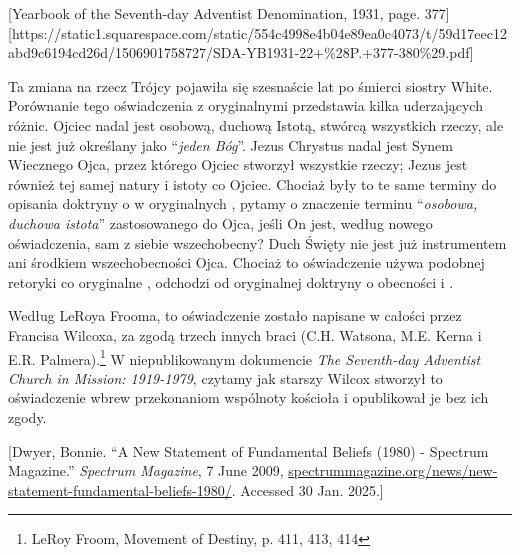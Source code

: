 [Yearbook of the Seventh-day Adventist Denomination, 1931, page. 377][https://static1.squarespace.com/static/554c4998e4b04e89ea0c4073/t/59d17eec12abd9c6194cd26d/1506901758727/SDA-YB1931-22+\%28P.+377-380\%29.pdf]

Ta zmiana na rzecz Trójcy pojawiła się szesnaście lat po śmierci siostry White. Porównanie tego oświadczenia z oryginalnymi  przedstawia kilka uderzających różnic. Ojciec nadal jest osobową, duchową Istotą, stwórcą wszystkich rzeczy, ale nie jest już określany jako “\textit{jeden Bóg}”. Jezus Chrystus nadal jest Synem Wiecznego Ojca, przez którego Ojciec stworzył wszystkie rzeczy; Jezus jest również tej samej natury i istoty co Ojciec. Chociaż były to te same terminy do opisania doktryny o  w oryginalnych , pytamy o znaczenie terminu “\textit{osobowa, duchowa istota}” zastosowanego do Ojca, jeśli On jest, według nowego oświadczenia, sam z siebie wszechobecny? Duch Święty nie jest już instrumentem ani środkiem wszechobecności Ojca. Chociaż to oświadczenie używa podobnej retoryki co oryginalne , odchodzi od oryginalnej doktryny o obecności i .

Według LeRoya Frooma, to oświadczenie zostało napisane w całości przez Francisa Wilcoxa, za zgodą trzech innych braci (C.H. Watsona, M.E. Kerna i E.R. Palmera).\footnote{LeRoy Froom, Movement of Destiny, p. 411, 413, 414} W niepublikowanym dokumencie \textit{The Seventh-day Adventist Church in Mission: 1919-1979}, czytamy jak starszy Wilcox stworzył to oświadczenie wbrew przekonaniom wspólnoty kościoła i opublikował je bez ich zgody.

[Dwyer, Bonnie. “A New Statement of Fundamental Beliefs (1980) - Spectrum Magazine.” \textit{Spectrum Magazine}, 7 June 2009, \href{https://spectrummagazine.org/news/new-statement-fundamental-beliefs-1980/}{spectrummagazine.org/news/new-statement-fundamental-beliefs-1980/}. Accessed 30 Jan. 2025.]

